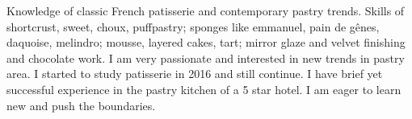 

\begin{cvparagraph}

Knowledge of classic French patisserie and contemporary pastry trends. Skills of shortcrust, sweet, choux, puffpastry; sponges like emmanuel, pain de gênes, daquoise, melindro; mousse, layered cakes, tart; mirror glaze and velvet finishing and chocolate work. I am very passionate and interested in new trends in pastry area. I started to study patisserie in 2016 and still continue. I have brief yet successful experience in the pastry kitchen of a 5 star hotel. I am eager to learn new and push the boundaries.
\end{cvparagraph}
